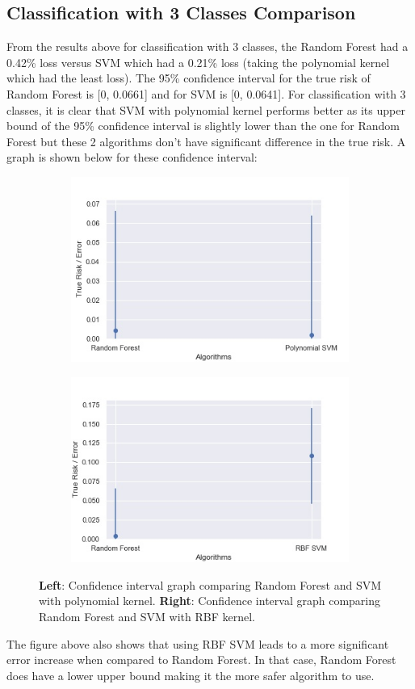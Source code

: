 \documentclass[11pt,a4paper,titlepage]{article}
\begin{document}
	\subsection{Classification with 3 Classes Comparison}
	From the results above for classification with 3 classes, the Random Forest had a 0.42\% loss versus SVM which had a 0.21\% loss (taking the polynomial kernel which had the least loss). The 95\% confidence interval for the true risk of Random Forest is [0, 0.0661] and for SVM is [0, 0.0641]. For classification with 3 classes, it is clear that SVM with polynomial kernel performs better as its upper bound of the 95\% confidence interval is slightly lower than the one for Random Forest but these 2 algorithms don't have significant difference in the true risk. A graph is shown below for these confidence interval:
	\begin{figure}[H]
		\centering
		\begin{subfigure}{0.4\textwidth}
			\includegraphics[scale=0.4]{img/3classes_errorgraph1.jpg}
		\end{subfigure}
		\begin{subfigure}{0.4\textwidth}
			\includegraphics[scale=0.4]{img/3classes_errorgraph2.jpg}
		\end{subfigure}
		\caption{\textbf{Left}: Confidence interval graph comparing Random Forest and SVM with polynomial kernel. \textbf{Right}: Confidence interval graph comparing Random Forest and SVM with RBF kernel.}
	\end{figure}
	\noindent The figure above also shows that using RBF SVM leads to a more significant error increase when compared to Random Forest. In that case, Random Forest does have a lower upper bound making it the more safer algorithm to use. 
	 
\end{document}
